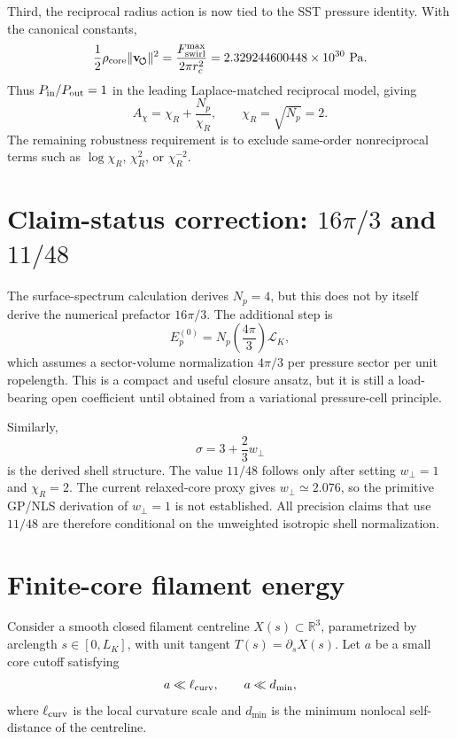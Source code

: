 \documentclass[11pt]{article}
\begin{document}
Third, the reciprocal radius action is now tied to the SST pressure identity.
With the canonical constants,
\[
  \frac12\rho_{\rm core}
  \lVert\mathbf v_{\!\boldsymbol{\circlearrowleft}}\rVert^2
  =
  \frac{F_{\rm swirl}^{\max}}{2\pi r_c^2}
  =
  2.329244600448\times10^{30}\ {\rm Pa}.
\]
Thus \(P_{\rm in}/P_{\rm out}=1\) in the leading Laplace-matched reciprocal
model, giving
\[
  A_\chi=\chi_R+\frac{N_p}{\chi_R},
  \qquad
  \chi_R=\sqrt{N_p}=2.
\]
The remaining robustness requirement is to exclude same-order nonreciprocal
terms such as \(\log\chi_R\), \(\chi_R^2\), or \(\chi_R^{-2}\).


\section{Claim-status correction: \(16\pi/3\) and \(11/48\)}
\label{sec:claim-status-16pi-11over48}

The surface-spectrum calculation derives \(N_p=4\), but this does not by itself
derive the numerical prefactor \(16\pi/3\).  The additional step is
\[
  E_p^{(0)}
  =
  N_p\left(\frac{4\pi}{3}\right)\mathcal L_K,
\]
which assumes a sector-volume normalization \(4\pi/3\) per pressure sector per
unit ropelength.  This is a compact and useful closure ansatz, but it is still a
load-bearing open coefficient until obtained from a variational pressure-cell
principle.

Similarly,
\[
  \sigma=3+\frac23w_\perp
\]
is the derived shell structure.  The value \(11/48\) follows only after setting
\(w_\perp=1\) and \(\chi_R=2\).  The current relaxed-core proxy gives
\(w_\perp\simeq2.076\), so the primitive GP/NLS derivation of \(w_\perp=1\) is
not established.  All precision claims that use \(11/48\) are therefore
conditional on the unweighted isotropic shell normalization.

\section{Finite-core filament energy}

Consider a smooth closed filament centreline \(X(s)\subset\mathbb R^3\), parametrized by
arclength \(s\in[0,L_K]\), with unit tangent \(T(s)=\partial_s X(s)\).  Let \(a\) be a small
core cutoff satisfying
\[
  a\ll \ell_{\rm curv},\qquad a\ll d_{\min},
\]
where \(\ell_{\rm curv}\) is the local curvature scale and \(d_{\min}\) is the minimum
nonlocal self-distance of the centreline.
\end{document}
